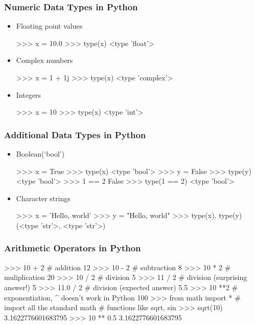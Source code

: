 \documentclass{beamer}
\begin{document}
\begin{frame}[fragile]
  \frametitle{Numeric Data Types in Python}
\begin{itemize}

\item Floating point values
\begin{Pcode}
>>> x = 10.0
>>> type(x)
<type 'float'>
\end{Pcode}

\item Complex numbers
\begin{Pcode}
>>> x = 1 + 1j
>>> type(x)
<type 'complex'>
\end{Pcode}

\item Integers
\begin{Pcode}
>>> x = 10
>>> type(x)
<type 'int'>
\end{Pcode}

\end{itemize}

\end{frame}

\begin{frame}[fragile]
  \frametitle{Additional Data Types in Python}
\begin{itemize}

\item Boolean(`bool')
\begin{Pcode}
>>> x = True
>>> type(x)
<type 'bool'>
>>> y = False
>>> type(y)
<type 'bool'>
>>> 1 == 2
False
>>> type(1 == 2)
<type 'bool'>
\end{Pcode}

\item Character strings
\begin{Pcode}
>>> x = 'Hello, world'
>>> y = "Hello, world"
>>> type(x), type(y)
(<type 'str'>, <type 'str'>)
\end{Pcode}

\end{itemize}

\end{frame}

\begin{frame}[fragile]
  \frametitle{Arithmetic Operators in Python}


\begin{Pcode}
>>> 10 + 2 # addition
12
>>> 10 - 2 # subtraction
8
>>> 10 * 2 # muliplication
20
>>> 10 / 2 # division
5
>>> 11 / 2 # division (surprising answer!)
5
>>> 11.0 / 2 # division (expected answer)
5.5
>>> 10 **2 # exponentiation, ^ doesn't work in Python
100
>>> from math import * # import all the standard math 
                       # functions like sqrt, sin
>>> sqrt(10)
3.1622776601683795
>>> 10 ** 0.5
3.1622776601683795
\end{Pcode}

\end{frame}
\end{document}
